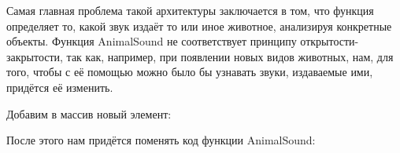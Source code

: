 \documentclass[a4paper]{article}
\begin{document}
Самая главная проблема такой архитектуры заключается в том, что функция определяет то, какой звук издаёт то или иное животное, анализируя конкретные объекты. Функция AnimalSound не соответствует принципу открытости-закрытости, так как, например, при появлении новых видов животных, нам, для того, чтобы с её помощью можно было бы узнавать звуки, издаваемые ими, придётся её изменить.

\newpage
Добавим в массив новый элемент:

\begin{figure}[h]
\end{figure}

После этого нам придётся поменять код функции AnimalSound:

\begin{figure}[h]
\end{figure}
\end{document}
